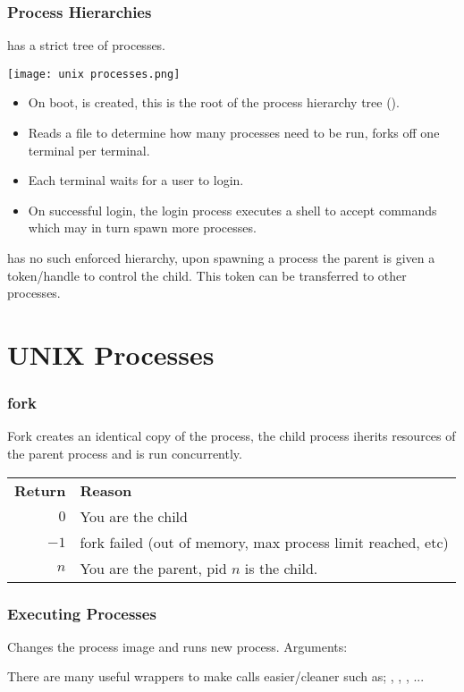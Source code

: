 \documentclass{report}
\begin{document}
\subsubsection*{Process Hierarchies}
 has a strict tree of processes.
\begin{center}
	\texttt{[image: unix processes.png]}
\end{center}
\begin{itemize}
	\item On boot,  is created, this is the root of the process hierarchy tree ().
	\item Reads a file to determine how many processes need to be run, forks off one terminal per terminal.
	\item Each terminal waits for a user to login.
	\item On successful login, the login process executes a shell to accept commands which may in turn spawn more processes.
\end{itemize}
 has no such enforced hierarchy, upon spawning a process the parent is given a token/handle to control the child. This token can be transferred to other processes.
\section*{UNIX Processes}
\subsubsection*{fork}

Fork creates an identical copy of the process, the child process iherits resources of the parent process and is run concurrently.
\\\begin{tabular}{r l}
	\textbf{Return} & \textbf{Reason}                                             \\
	$0$             & You are the child                                           \\
	$-1$            & fork failed (out of memory, max process limit reached, etc) \\
	$n$             & You are the parent, pid $n$ is the child.                   \\
\end{tabular}


\subsubsection*{Executing Processes}

Changes the process image and runs new process.
Arguments:
\begin{itemize}
\end{itemize}
There are many useful wrappers to make calls easier/cleaner such as; , , , ...
\end{document}
